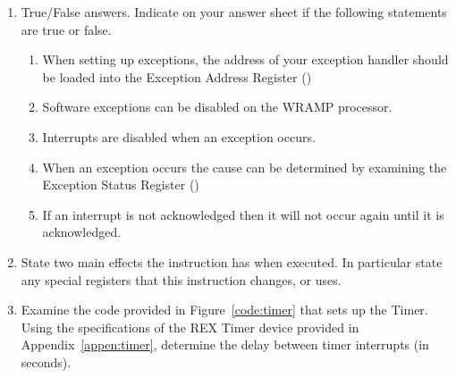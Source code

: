\documentclass[a4paper,10pt]{article}
\begin{document}
\EXTESTHEADING{\INTERNO}{\INTERTESTDATE}




\begin{enumerate}
\item True/False answers. Indicate on your answer sheet if the
following statements are true or false.

\begin{enumerate}

\item When setting up exceptions, the address of your exception
handler should be loaded into the Exception Address Register
()

\item Software exceptions can be disabled on the WRAMP processor.

\item Interrupts are disabled when an exception occurs.

\item When an exception occurs the cause can be determined by
examining the Exception Status Register ()

\item If an interrupt is not acknowledged then it will not occur again
until it is acknowledged.

\end{enumerate}


\item State two main effects the  instruction has when
executed. In particular state any special registers that this
instruction changes, or uses.


\item Examine the code provided in Figure~\ref{code:timer} that sets
up the Timer. Using the specifications of the REX Timer device
provided in Appendix~\ref{appen:timer}, determine the delay between
timer interrupts (in seconds).


\end{enumerate}
\end{document}
